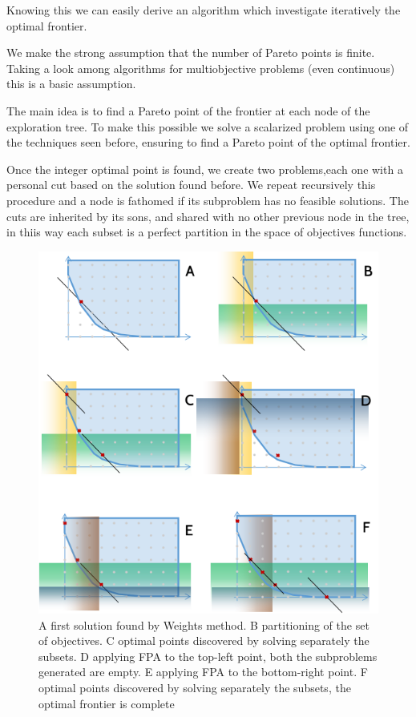 \documentclass{article}
\begin{document}
	Knowing this we can easily derive an algorithm which investigate iteratively the optimal frontier.
	
	We make the strong assumption that the number of Pareto points is finite.  Taking a look among algorithms for multiobjective problems (even continuous) this is a basic assumption.

	The main idea is to find a Pareto point of the frontier at each node of the exploration tree. To make this possible we solve a scalarized problem using one of the techniques seen before, ensuring to find a Pareto point of the optimal frontier.
	
	
	Once the integer optimal point is found, we create two problems,each one with a personal cut based on the solution found before. We repeat recursively this procedure and a node is fathomed if its subproblem has no feasible solutions. The cuts are inherited by its sons, and shared with no other previous node in the tree, in thiis way each subset is a perfect partition in the space of objectives functions.
	\begin{figure}
		\caption{A first solution found by Weights method. B partitioning of the set of objectives. C optimal points discovered by solving separately the subsets. D applying FPA to the top-left point, both the subproblems generated are empty. E applying FPA to the bottom-right point. F optimal points discovered by solving separately the subsets, the optimal frontier is complete}
		\includegraphics[scale=1]{example.png}
	\end{figure}
	\medskip
	
\end{document}
